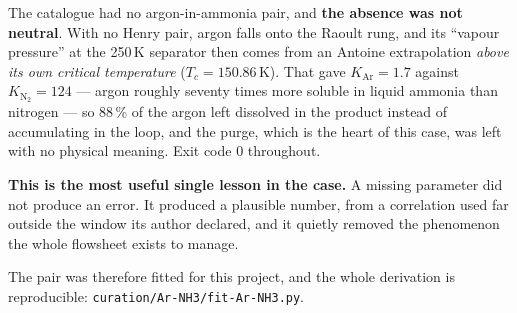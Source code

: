 \documentclass[11pt,a4paper]{article}
\begin{document}
The catalogue had no argon-in-ammonia pair, and \textbf{the absence was not
neutral}. With no Henry pair, argon falls onto the Raoult rung, and its
``vapour pressure'' at the 250\,K separator then comes from an Antoine
extrapolation \emph{above its own critical temperature}
($T_c = 150.86$\,K). That gave $K_{\mathrm{Ar}} = 1.7$ against
$K_{\mathrm{N_2}} = 124$ --- argon roughly seventy times more soluble in liquid
ammonia than nitrogen --- so 88\,\% of the argon left dissolved in the product
instead of accumulating in the loop, and the purge, which is the heart of this
case, was left with no physical meaning. Exit code 0 throughout.

\begin{caveat}
\textbf{This is the most useful single lesson in the case.} A missing
parameter did not produce an error. It produced a plausible number, from a
correlation used far outside the window its author declared, and it quietly
removed the phenomenon the whole flowsheet exists to manage.
\end{caveat}

The pair was therefore fitted for this project, and the whole derivation is
reproducible: \texttt{curation/Ar-NH3/fit-Ar-NH3.py}.
\end{document}
